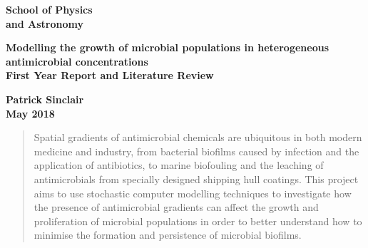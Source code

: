 \documentclass[a4paper,12pt]{article}
\begin{document}
\begin{minipage}[b]{110mm}
        {\Huge\bf School of Physics \\and Astronomy
        \vspace*{17mm}}
\end{minipage}
\hfill
\begin{minipage}[t]{40mm}               
\end{minipage}
\par\noindent                                           %
\vspace*{2cm}
\begin{center}
        \Large\bf Modelling the growth of microbial populations in heterogeneous antimicrobial concentrations \\
        \Large\bf First Year Report and Literature Review
\end{center}
\vspace*{1.5cm}
\begin{center}
        \bf Patrick Sinclair\\                 %
        May 2018                          %
\end{center}
\vspace*{5mm}
%
%                       
\begin{abstract}
	Spatial gradients of antimicrobial chemicals are ubiquitous in both modern medicine and industry, from bacterial biofilms caused by infection and the application of antibiotics, 
	to marine biofouling and the leaching of antimicrobials from specially designed shipping hull coatings.  
        This project aims to use stochastic computer modelling techniques to investigate how the presence of antimicrobial gradients can affect the growth and proliferation 
        of microbial populations in order to better understand how to minimise the formation and persistence of microbial biofilms.
\end{abstract}
\end{document}
